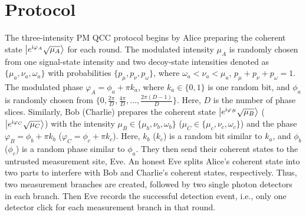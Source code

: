 \documentclass[aps,twocolumn,superscriptaddress,showpacs,nofootinbib]{revtex4-2}
\renewcommand{\i}{\mathrm{i}}
\begin{document}
\section{Protocol}
The three-intensity PM QCC protocol begins by Alice preparing the coherent state $\ket{e^{\i\varphi_A}\sqrt{\mu_A}}$ for each round. The modulated intensity $\mu_A$ is randomly chosen from one signal-state intensity and two decoy-state intensities denoted as $\{ \mu_a, \nu_a, \omega_a \}$ with probabilities $\{ p_\mu, p_\nu, p_\omega\}$, where $\omega_a<\nu_a<\mu_a$, $p_\mu+ p_\nu+p_\omega=1$. The modulated phase $\varphi_A=\phi_a+\pi k_a$, where $k_a \in\{0, 1\}$ is one random bit, and $\phi_a$ is randomly chosen from $ \{ 0,\frac{2\pi}{D},\frac{4\pi}{D},...,\frac{2\pi(D-1)}{D} \} $. Here, $D$ is the number of phase slices. Similarly, Bob (Charlie) prepares the coherent state $\ket{e^{\i\varphi_B}\sqrt{\mu_B}}$ ($\ket{e^{\i\varphi_C}\sqrt{\mu_C}}$) with the intensity $\mu_B \in \{\mu_b,\nu_b,\omega_b\}$ ($\mu_C\in \{\mu_c,\nu_c,\omega_c\}$) and the phase $\varphi_B=\phi_b+\pi k_b$ ($\varphi_C=\phi_c+\pi k_c$). Here, $k_b$ ($k_c$) is a random bit similar to $k_a$, and $\phi_b$ ($\phi_c$) is a random phase similar to  $\phi_a$. They then send their coherent states to the untrusted measurement site, Eve. An honest Eve splits Alice's coherent state into two parts to interfere with Bob and Charlie's coherent states, respectively. Thus, two measurement branches are created, followed by two single photon detectors in each branch. Then Eve records the successful detection event, i.e., only one detector click for each measurement branch in that round.
\end{document}
